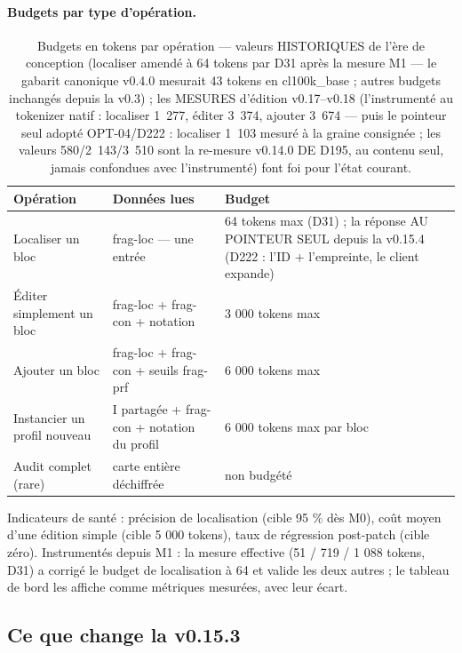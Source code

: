 \paragraph{Budgets par type d’opération.}

\begin{table}[htbp]
\centering\small
\caption{Budgets en tokens par opération — valeurs HISTORIQUES de l'ère de conception (localiser amendé à 64 tokens par D31 après la mesure M1 — le gabarit canonique v0.4.0 mesurait 43 tokens en cl100k\_base ; autres budgets inchangés depuis la v0.3) ; les MESURES d'édition v0.17--v0.18 (l'instrumenté au tokenizer natif :
localiser 1~277, éditer 3~374, ajouter 3~674 — puis le pointeur seul adopté
OPT-04/D222 : localiser 1~103 mesuré à la graine consignée ; les valeurs
580/2~143/3~510 sont la re-mesure v0.14.0 DE D195, au contenu seul, jamais
confondues avec l'instrumenté) font foi pour l'état courant.}
\label{tab:budgets}
\begin{tabularx}{\textwidth}{@{}Y Y l@{}}
\toprule
\textbf{Opération} & \textbf{Données lues} & \textbf{Budget} \\
\midrule
Localiser un bloc & frag-loc — une entrée & 64 tokens max (D31) ; la réponse AU POINTEUR SEUL depuis la v0.15.4 (D222 : l'ID + l'empreinte, le client expande) \\
Éditer simplement un bloc & frag-loc + frag-con + notation & 3 000 tokens max \\
Ajouter un bloc & frag-loc + frag-con + seuils frag-prf & 6 000 tokens max \\
Instancier un profil nouveau & I partagée + frag-con + notation du profil & 6 000 tokens
max par bloc \\
Audit complet (rare) & carte entière déchiffrée & non budgété \\
\bottomrule
\end{tabularx}
\end{table}

Indicateurs de santé : précision de localisation (cible 95 \% dès M0), coût moyen d’une
édition simple (cible 5 000 tokens), taux de régression post-patch (cible zéro).
Instrumentés depuis M1 : la mesure effective (51 / 719 / 1 088 tokens, D31) a corrigé
le budget de localisation à 64 et valide les deux autres ; le tableau de bord les
affiche comme métriques mesurées, avec leur écart.
\subsection{Ce que change la v0.15.3}\label{sec:nouveautes153}

